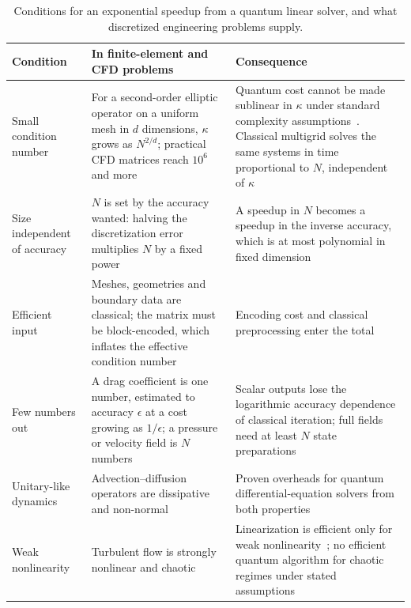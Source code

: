 \documentclass[10pt,a4paper]{article}
\begin{document}
\begin{table}[htbp]
\centering\small
\caption{Conditions for an exponential speedup from a quantum linear solver, and what discretized engineering problems supply.}\label{tab:linreq}
\begin{tabular}{@{}L{3.0cm} L{6.0cm} L{6.8cm}@{}}
\toprule
Condition & In finite-element and CFD problems & Consequence\\\midrule
Small condition number & For a second-order elliptic operator on a uniform mesh in $d$ dimensions, $\kappa$ grows as $N^{2/d}$; practical CFD matrices reach $10^6$ and more~\cite{goldfriend2026} & Quantum cost cannot be made sublinear in $\kappa$ under standard complexity assumptions~\cite{hhl2009}. Classical multigrid solves the same systems in time proportional to $N$, independent of $\kappa$~\cite{brandt1977}\\
Size independent of accuracy & $N$ is set by the accuracy wanted: halving the discretization error multiplies $N$ by a fixed power & A speedup in $N$ becomes a speedup in the inverse accuracy, which is at most polynomial in fixed dimension~\cite{montanaro2016}\\
Efficient input & Meshes, geometries and boundary data are classical; the matrix must be block-encoded, which inflates the effective condition number~\cite{lapworth2025} & Encoding cost and classical preprocessing enter the total~\cite{lapworth2022}\\
Few numbers out & A drag coefficient is one number, estimated to accuracy $\epsilon$ at a cost growing as $1/\epsilon$; a pressure or velocity field is $N$ numbers & Scalar outputs lose the logarithmic accuracy dependence of classical iteration; full fields need at least $N$ state preparations\\
Unitary-like dynamics & Advection--diffusion operators are dissipative and non-normal & Proven overheads for quantum differential-equation solvers from both properties~\cite{an2025}\\
Weak nonlinearity & Turbulent flow is strongly nonlinear and chaotic & Linearization is efficient only for weak nonlinearity~\cite{liu2021c}; no efficient quantum algorithm for chaotic regimes under stated assumptions~\cite{lewis2024}\\
\bottomrule
\end{tabular}
\end{table}
\end{document}
